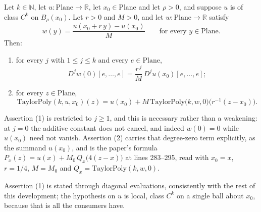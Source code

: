 \begin{lemma}
Let $k\in\mathbb{N}$, let $u\colon\mathrm{Plane}\to\mathbb{R}$, let $x_0\in\mathrm{Plane}$ and
let $\rho>0$, and suppose $u$ is of class $C^{k}$ on $B_{\rho}(x_0)$.  Let $r>0$ and $M>0$, and
let $w\colon\mathrm{Plane}\to\mathbb{R}$ satisfy
\[
  w(y)=\frac{u(x_0+r\,y)-u(x_0)}{M}\qquad\text{for every }y\in\mathrm{Plane}.
\]
Then:
\begin{enumerate}
\item for every $j$ with $1\le j\le k$ and every $e\in\mathrm{Plane}$,
\[
  D^{j}w(0)[e,\ldots,e]=\frac{r^{\,j}}{M}\,D^{j}u(x_0)[e,\ldots,e];
\]
\item for every $z\in\mathrm{Plane}$,
\[
  \mathrm{TaylorPoly}(k,u,x_0)(z)
    =u(x_0)+M\,\mathrm{TaylorPoly}\bigl(k,w,0\bigr)\bigl(r^{-1}(z-x_0)\bigr).
\]
\end{enumerate}
Assertion (1) is restricted to $j\ge1$, and this is necessary rather than a weakening: at
$j=0$ the additive constant does not cancel, and indeed $w(0)=0$ while $u(x_0)$ need not
vanish.  Assertion (2) carries that degree-zero term explicitly, as the summand $u(x_0)$, and
is the paper's formula $P_x(z)=u(x)+M_0\,Q_x\bigl(4(z-x)\bigr)$ at lines 283--295, read with
$x_0=x$, $r=1/4$, $M=M_0$ and $Q_x=\mathrm{TaylorPoly}(k,w,0)$.

Assertion (1) is stated through diagonal evaluations, consistently with the rest of this
development; the hypothesis on $u$ is local, class $C^{k}$ on a single ball about $x_0$,
because that is all the consumers have.
\end{lemma}
